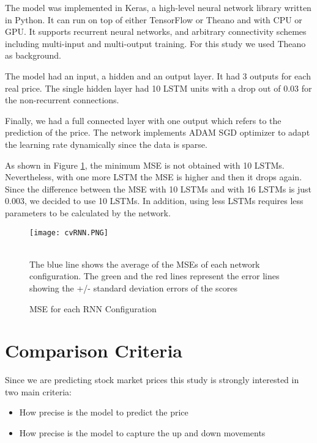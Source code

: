 The model was implemented in Keras, a high-level neural network library written in Python. It can run on top of either TensorFlow or Theano and with CPU or GPU. It supports recurrent neural networks, and arbitrary connectivity schemes including multi-input and multi-output training. For this study we used Theano as background.

The model had an input, a hidden and an output layer. It had 3 outputs for each real price. The single hidden layer had 10 LSTM units with a drop out of 0.03 for the non-recurrent connections. 

Finally, we had a full connected layer with one output which refers to the prediction of the price. The network implements ADAM SGD optimizer to adapt the learning rate dynamically since the data is sparse. 

As shown in Figure \ref{fig:cvRNN}, the minimum MSE is not obtained with 10 LSTMs. Nevertheless, with one more LSTM the MSE is higher and then it drops again. Since the difference between the MSE with 10 LSTMs and with 16 LSTMs is just 0.003, we decided to use 10 LSTMs. In addition, using less LSTMs requires less parameters to be calculated by the network.  

\begin{figure}[h]
\centering
\texttt{[image: cvRNN.PNG]}
\caption{MSE for each RNN Configuration}
\begin{minipage}{12cm}
    \footnotesize
    \emph \\ The blue line shows the average of the MSEs of each network configuration. The green and the red lines represent the error lines showing the +/- standard deviation errors of the scores
    \end{minipage}
\label{fig:cvRNN}
\end{figure}

\section{Comparison Criteria}

Since we are predicting stock market prices this study is strongly interested in two main criteria:

\begin{itemize}
\item How precise is the model to predict the price
\item How precise is the model to capture the up and down movements
\end{itemize}

